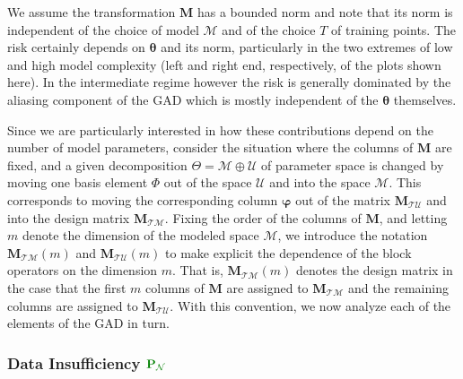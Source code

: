\documentclass[twocolumn,aps,prx,superscriptaddress,10pt]{revtex4-2}
\newcommand{\0}{\bm{0}}
\newcommand{\bphi}{\boldsymbol{\varphi}}
\newcommand{\btheta}{\boldsymbol{\theta}}
\newcommand{\M}{\mathcal{M}} %
\newcommand{\K}{\mathcal{N}} %
\newcommand{\T}{\mathcal{T}} %
\newcommand{\U}{\mathcal{U}} %
\newcommand{\bbPN}{{\color{Green}{\mathbf{P}_{\K}}}} %
\newcommand{\bbM}{\mathbf{M}}
\newcommand{\MTM}{\bbM_{\T\M}}
\newcommand{\MTU}{\bbM_{\T\U}}
\begin{document}
We assume the transformation $\bbM$ has a bounded norm and note that its norm is independent of the choice of model $\M$ and of the choice $T$ of training points.  The risk certainly depends on $\btheta$ and its norm, particularly in the two extremes of low and high model complexity (left and right end, respectively, of the plots shown here).  In the intermediate regime however the risk is generally dominated by the aliasing component of the GAD which is mostly independent of the $\btheta$ themselves.


Since we are particularly interested in how these contributions depend on the number of model parameters, consider the situation where the columns of $\bbM$ are fixed, and a given decomposition  $\Theta = \M \oplus \U$ of parameter space is changed by moving one basis element $\Phi$ out of the space $\U$ and into the space $\M$.  This corresponds to moving the corresponding column $\bphi$ out of the matrix $\MTU$ and into the design matrix $\MTM$. Fixing the order of the columns of $\bbM$, and letting $m$ denote the dimension of the modeled space $\M$, we introduce the notation $\MTM(m)$ and $\MTU(m)$ to make explicit the dependence of the block operators on the dimension $m$. That is, $\MTM(m)$ denotes the design matrix in the case that the first $m$ columns of $\bbM$ are assigned to $\MTM$ and the remaining columns are assigned to $\MTU$.
With this convention, we now analyze each of the elements of the GAD in turn.

\subsubsection{Data Insufficiency \texorpdfstring{$\bbPN$}{PN}}\label{sec:data_insufficiency}
\end{document}
